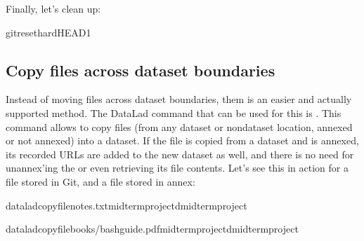 \sphinxAtStartPar
Finally, let’s clean up:

\begin{sphinxVerbatim}[commandchars=\\\{\}]
gitreset\PYGZhy{}\PYGZhy{}hardHEAD\PYGZti{}1
\end{sphinxVerbatim}

\ignorespaces 

\subsection{Copy files across dataset boundaries}
\label{\detokenize{basics/101-136-filesystem:copy-files-across-dataset-boundaries}}\label{\detokenize{basics/101-136-filesystem:index-9}}\label{\detokenize{basics/101-136-filesystem:copyfilefs}}
\sphinxAtStartPar
Instead of moving files across dataset boundaries,  them is an easier
and actually supported method.
The DataLad command that can be used for this is .
This command allows to copy files
(from any dataset or non\sphinxhyphen{}dataset location, annexed or not annexed) into a dataset.
If the file is copied from a dataset and is annexed, its recorded URLs
are added to the new dataset as well, and there is no need for unannex’ing the
or even retrieving its file contents. Let’s see this in action for a file
stored in Git, and a file stored in annex:

\begin{sphinxVerbatim}[commandchars=\\\{\}]
dataladcopy\PYGZhy{}filenotes.txtmidterm\PYGZus{}project\PYGZhy{}dmidterm\PYGZus{}project
\end{sphinxVerbatim}

\begin{sphinxVerbatim}[commandchars=\\\{\}]
dataladcopy\PYGZhy{}filebooks/bash\PYGZus{}guide.pdfmidterm\PYGZus{}project\PYGZhy{}dmidterm\PYGZus{}project
\end{sphinxVerbatim}

